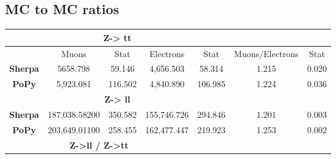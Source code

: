 \subsection{MC to MC ratios}\label{RatiosTables}
\begin{table}[h!]
	\centering
	\begin{tabular}{|ccccccc|}
		\hline
		\multicolumn{5}{|c|}{\textbf{Z-> tt}}                                                                                                                                       & \multicolumn{1}{l|}{\textbf{}}       & \multicolumn{1}{l|}{\textbf{}} \\ \hline
		\multicolumn{1}{|l|}{\textbf{}}       & \multicolumn{1}{c|}{Muons}         & \multicolumn{1}{c|}{Stat}    & \multicolumn{1}{c|}{Electrons}   & \multicolumn{1}{c|}{Stat}    & \multicolumn{1}{c|}{Muons/Electrons} & Stat                           \\ \hline
		\multicolumn{1}{|c|}{\textbf{Sherpa}} & \multicolumn{1}{c|}{5658.798}      & \multicolumn{1}{c|}{59.146}  & \multicolumn{1}{c|}{4,656.503}   & \multicolumn{1}{c|}{58.314}  & \multicolumn{1}{c|}{1.215}           & 0.020                          \\ \hline
		\multicolumn{1}{|c|}{\textbf{PoPy}}   & \multicolumn{1}{c|}{5,923.081}     & \multicolumn{1}{c|}{116.502} & \multicolumn{1}{c|}{4,840.890}   & \multicolumn{1}{c|}{106.985} & \multicolumn{1}{c|}{1.224}           & 0.036                          \\ \hline
		\multicolumn{5}{|c|}{\textbf{Z-> ll}}                                                                                                                                       & \multicolumn{1}{c|}{}                &                                \\ \hline
		\multicolumn{1}{|c|}{\textbf{Sherpa}} & \multicolumn{1}{c|}{187,038.58200} & \multicolumn{1}{c|}{350.582} & \multicolumn{1}{c|}{155,746.726} & \multicolumn{1}{c|}{294.846} & \multicolumn{1}{c|}{1.201}           & 0.003                          \\ \hline
		\multicolumn{1}{|c|}{\textbf{PoPy}}   & \multicolumn{1}{c|}{203,649.01100} & \multicolumn{1}{c|}{258.455} & \multicolumn{1}{c|}{162,477.447} & \multicolumn{1}{c|}{219.923} & \multicolumn{1}{c|}{1.253}           & 0.002                          \\ \hline
		\multicolumn{4}{|c|}{\textbf{Z->ll / Z->tt}}                                                                                                 & \multicolumn{1}{l|}{}        & \multicolumn{1}{l|}{}                & \multicolumn{1}{l|}{}          \\ \hline

\end{tabular}
\end{table}
